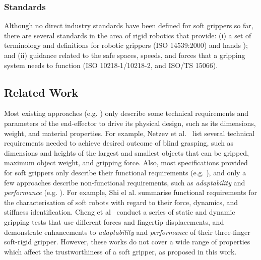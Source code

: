 \documentclass[letterpaper, 10 pt, conference]{ieeeconf}  %
\begin{document}
	\subsubsection{Standards} %
	Although no direct industry standards have been defined for soft grippers so far, there are several standards in the area of rigid robotics that provide: (i) a set of terminology and definitions for robotic grippers (ISO 14539:2000) and hands \cite{Falco2018}); and (ii) guidance related to the safe spaces, speeds, and forces that a gripping system needs to function (ISO 10218-1/10218-2, and ISO/TS 15066). %
	
	\subsection{Related Work}\label{relatedwork}
	Most existing approaches (e.g. \cite{Netzev2023,Hong2022,Bhattacharya2019,Tadakuma2020,Loh2014,Nishikawa2019,Mohan2020}) only describe some technical requirements and parameters of the end-effector to drive its physical design, such as its dimensions, weight, and material properties. For example, Netzev et al.~\cite{Netzev2023} list several technical requirements needed to achieve desired outcome of blind grasping, such as dimensions and heights of the largest and smallest objects that can be gripped, maximum object weight, and gripping force. 
	Also, most specifications provided for soft grippers only describe their functional requirements (e.g. \cite{Shi2023}), and only a few approaches describe non-functional requirements, such as \emph{adaptability} and \emph{performance} (e.g. \cite{Cheng2021,Liu2021,Chen2018,Cai2021,Hwang2020,Shin2021}).  
	For example, Shi el al. \cite{Shi2023} summarise functional requirements for the characterisation of soft robots with regard to
	their force, dynamics, and stiffness identification. 
	Cheng et al~\cite{Cheng2021} conduct a series of static and dynamic gripping tests that use different forces and fingertip displacements, and demonstrate enhancements to \emph{adaptability} and \emph{performance} of their three-finger soft-rigid gripper. %
	However, these works do not cover a wide range of properties which affect the trustworthiness of a soft gripper, as proposed in this work.  
	
\end{document}
